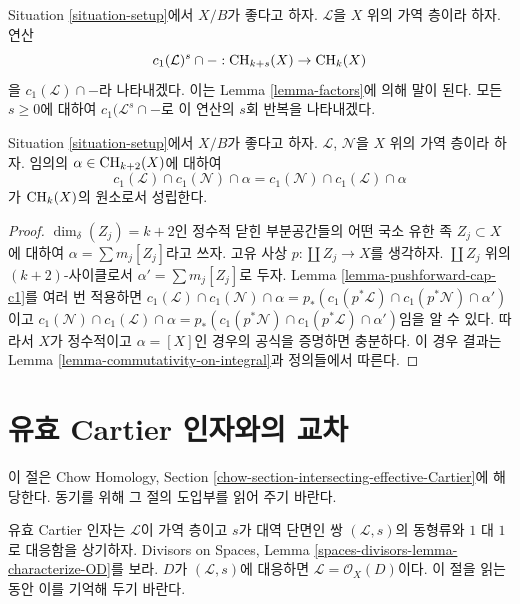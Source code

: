 \noindent
Situation \ref{situation-setup}에서 $X/B$가 좋다고 하자.
$\mathcal{L}$을 $X$ 위의 가역 층이라 하자. 연산
$$
c_1(\mathcal{L})^s \cap - : \mathop{\mathrm{CH}}\nolimits_{k + s}(X) \to \mathop{\mathrm{CH}}\nolimits_k(X)
$$
을 $c_1(\mathcal{L}) \cap - $라 나타내겠다. 이는 Lemma
\ref{lemma-factors}에 의해 말이 된다.
모든 $s \geq 0$에 대하여 $c_1(\mathcal{L}^s \cap -$로 이 연산의
$s$회 반복을 나타내겠다.

\begin{lemma}
\label{lemma-cap-commutative}
Situation \ref{situation-setup}에서 $X/B$가 좋다고 하자.
$\mathcal{L}$, $\mathcal{N}$을 $X$ 위의 가역 층이라 하자.
임의의 $\alpha \in \mathop{\mathrm{CH}}\nolimits_{k + 2}(X)$에 대하여
$$
c_1(\mathcal{L}) \cap c_1(\mathcal{N}) \cap \alpha
=
c_1(\mathcal{N}) \cap c_1(\mathcal{L}) \cap \alpha
$$
가 $\mathop{\mathrm{CH}}\nolimits_k(X)$의 원소로서 성립한다.
\end{lemma}

\begin{proof}
$\dim_\delta(Z_j) = k + 2$인 정수적 닫힌 부분공간들의 어떤 국소
유한 족 $Z_j \subset X$에 대하여
$\alpha = \sum m_j[Z_j]$라고 쓰자. 고유 사상
$p : \coprod Z_j \to X$를 생각하자. $\coprod Z_j$ 위의
$(k + 2)$-사이클로서 $\alpha' = \sum m_j[Z_j]$로 두자.
Lemma \ref{lemma-pushforward-cap-c1}를 여러 번 적용하면
$c_1(\mathcal{L}) \cap c_1(\mathcal{N}) \cap \alpha
= p_*(c_1(p^*\mathcal{L}) \cap c_1(p^*\mathcal{N}) \cap \alpha')$이고
$c_1(\mathcal{N}) \cap c_1(\mathcal{L}) \cap \alpha
= p_*(c_1(p^*\mathcal{N}) \cap c_1(p^*\mathcal{L}) \cap \alpha')$임을
알 수 있다. 따라서 $X$가 정수적이고 $\alpha = [X]$인 경우의 공식을
증명하면 충분하다. 이 경우 결과는 Lemma
\ref{lemma-commutativity-on-integral}과 정의들에서 따른다.
\end{proof}

\section{유효 Cartier 인자와의 교차}
\label{section-intersecting-effective-Cartier}

\noindent
이 절은 Chow Homology, Section
\ref{chow-section-intersecting-effective-Cartier}에 해당한다.
동기를 위해 그 절의 도입부를 읽어 주기 바란다.

\medskip\noindent
유효 Cartier 인자는 $\mathcal{L}$이 가역 층이고 $s$가 대역 단면인
쌍 $(\mathcal{L}, s)$의 동형류와 $1$ 대 $1$로 대응함을 상기하자.
Divisors on Spaces, Lemma
\ref{spaces-divisors-lemma-characterize-OD}를 보라.
$D$가 $(\mathcal{L}, s)$에 대응하면
$\mathcal{L} = \mathcal{O}_X(D)$이다. 이 절을 읽는 동안 이를
기억해 두기 바란다.

